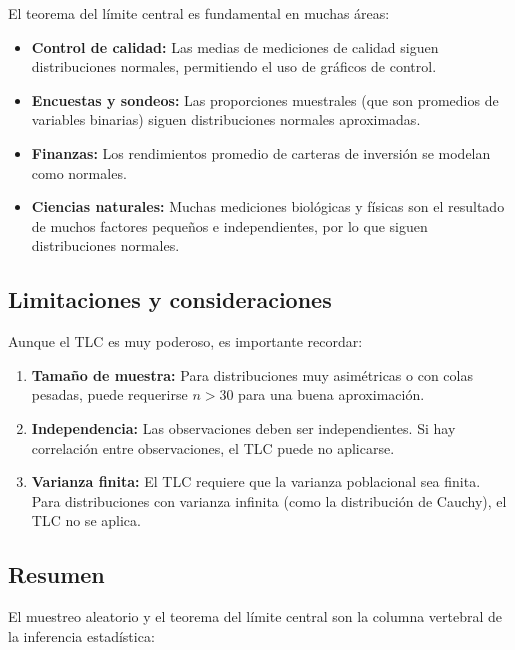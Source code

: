 El teorema del límite central es fundamental en muchas áreas:

\begin{itemize}
	\item \textbf{Control de calidad:} Las medias de mediciones de calidad siguen distribuciones normales, permitiendo el uso de gráficos de control.
	
	\item \textbf{Encuestas y sondeos:} Las proporciones muestrales (que son promedios de variables binarias) siguen distribuciones normales aproximadas.
	
	\item \textbf{Finanzas:} Los rendimientos promedio de carteras de inversión se modelan como normales.
	
	\item \textbf{Ciencias naturales:} Muchas mediciones biológicas y físicas son el resultado de muchos factores pequeños e independientes, por lo que siguen distribuciones normales.
\end{itemize}

\subsection{Limitaciones y consideraciones}

Aunque el TLC es muy poderoso, es importante recordar:

\begin{enumerate}
	\item \textbf{Tamaño de muestra:} Para distribuciones muy asimétricas o con colas pesadas, puede requerirse $n > 30$ para una buena aproximación.
	
	\item \textbf{Independencia:} Las observaciones deben ser independientes. Si hay correlación entre observaciones, el TLC puede no aplicarse.
	
	\item \textbf{Varianza finita:} El TLC requiere que la varianza poblacional sea finita. Para distribuciones con varianza infinita (como la distribución de Cauchy), el TLC no se aplica.
\end{enumerate}

\subsection{Resumen}

El muestreo aleatorio y el teorema del límite central son la columna vertebral de la inferencia estadística:

